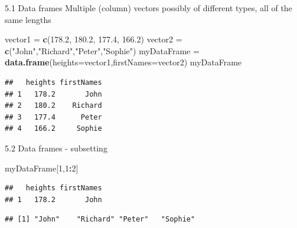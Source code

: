 \documentclass[
  ignorenonframetext,
]{beamer}
\newenvironment{Shaded}{\begin{snugshade}}{\end{snugshade}}
\newcommand{\AttributeTok}[1]{\textcolor[rgb]{0.13,0.29,0.53}{#1}}
\newcommand{\DecValTok}[1]{\textcolor[rgb]{0.00,0.00,0.81}{#1}}
\newcommand{\FloatTok}[1]{\textcolor[rgb]{0.00,0.00,0.81}{#1}}
\newcommand{\FunctionTok}[1]{\textcolor[rgb]{0.13,0.29,0.53}{\textbf{#1}}}
\newcommand{\NormalTok}[1]{#1}
\newcommand{\OtherTok}[1]{\textcolor[rgb]{0.56,0.35,0.01}{#1}}
\newcommand{\SpecialCharTok}[1]{\textcolor[rgb]{0.81,0.36,0.00}{\textbf{#1}}}
\newcommand{\StringTok}[1]{\textcolor[rgb]{0.31,0.60,0.02}{#1}}
\begin{document}
\begin{frame}[fragile]{5.1 Data frames}
\protect\hypertarget{data-frames}{}
Multiple (column) vectors possibly of different types, all of the same
lengths

\begin{Shaded}
\begin{Highlighting}[]
\NormalTok{vector1 }\OtherTok{=} \FunctionTok{c}\NormalTok{(}\FloatTok{178.2}\NormalTok{, }\FloatTok{180.2}\NormalTok{, }\FloatTok{177.4}\NormalTok{, }\FloatTok{166.2}\NormalTok{)}
\NormalTok{vector2 }\OtherTok{=}  \FunctionTok{c}\NormalTok{(}\StringTok{"John"}\NormalTok{,}\StringTok{"Richard"}\NormalTok{,}\StringTok{"Peter"}\NormalTok{,}\StringTok{"Sophie"}\NormalTok{)}
\NormalTok{myDataFrame }\OtherTok{=} \FunctionTok{data.frame}\NormalTok{(}\AttributeTok{heights=}\NormalTok{vector1,}\AttributeTok{firstNames=}\NormalTok{vector2)}
\NormalTok{myDataFrame}
\end{Highlighting}
\end{Shaded}

\begin{verbatim}
##   heights firstNames
## 1   178.2       John
## 2   180.2    Richard
## 3   177.4      Peter
## 4   166.2     Sophie
\end{verbatim}
\end{frame}

\begin{frame}[fragile]{5.2 Data frames - subsetting}
\protect\hypertarget{data-frames---subsetting}{}
\begin{Shaded}
\begin{Highlighting}[]
\NormalTok{myDataFrame[}\DecValTok{1}\NormalTok{,}\DecValTok{1}\SpecialCharTok{:}\DecValTok{2}\NormalTok{]}
\end{Highlighting}
\end{Shaded}

\begin{verbatim}
##   heights firstNames
## 1   178.2       John
\end{verbatim}

\begin{Shaded}
\end{Shaded}

\begin{verbatim}
## [1] "John"    "Richard" "Peter"   "Sophie"
\end{verbatim}
\end{frame}
\end{document}
